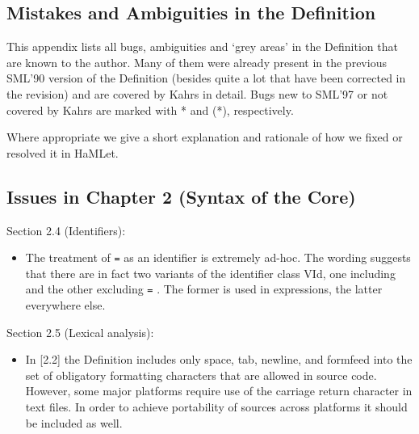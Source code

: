 \documentclass[twoside,titlepage]{article}
\begin{document}
\vfill
\pagebreak
\begin{appendix}

\section{Mistakes and Ambiguities in the Definition}
\label{definitionbugs}

This appendix lists all bugs, ambiguities and `grey areas' in the Definition that are known to the author. Many of them were already present in the previous SML'90 version of the Definition \cite{definition90} (besides quite a lot that have been corrected in the revision) and are covered by Kahrs \cite{mistakes, addenda} in detail. Bugs new to SML'97 or not covered by Kahrs are marked with * and (*), respectively.

Where appropriate we give a short explanation and rationale of how we fixed or resolved it in HaMLet.


\subsection{Issues in Chapter 2 (Syntax of the Core)}
\label{bugschapter2}

Section 2.4 (Identifiers):

\begin{itemize}
\item The treatment of {\tt =} as an identifier is extremely ad-hoc. The wording suggests that there are in fact two variants of the identifier class VId, one including and the other excluding {\tt =} . The former is used in expressions, the latter everywhere else.
\end{itemize}


Section 2.5 (Lexical analysis):
\nopagebreak

\begin{itemize}
\item In [2.2] the Definition includes only space, tab, newline, and formfeed into the set of obligatory formatting characters that are allowed in source code. However, some major platforms require use of the carriage return character in text files. In order to achieve portability of sources across platforms it should be included as well.


\end{itemize}
\end{appendix}
\end{document}
